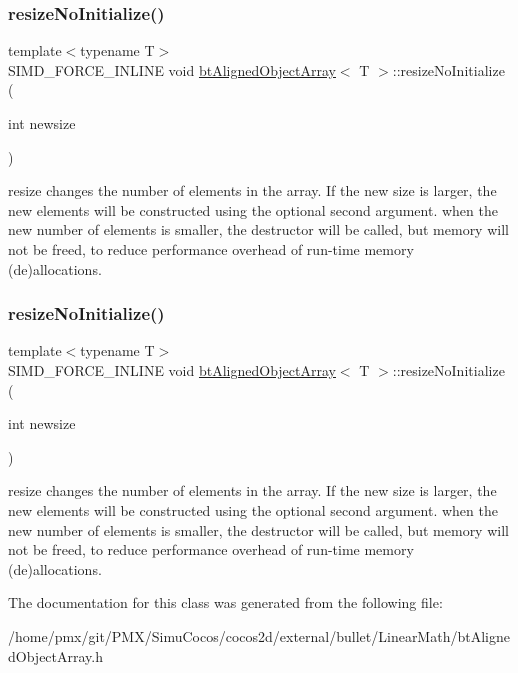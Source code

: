 \subsubsection{\texorpdfstring{resize\+No\+Initialize()}{resizeNoInitialize()}\hspace{0.1cm}{\footnotesize\ttfamily [1/2]}}
{\footnotesize\ttfamily template$<$typename T$>$ \\
S\+I\+M\+D\+\_\+\+F\+O\+R\+C\+E\+\_\+\+I\+N\+L\+I\+NE void \hyperlink{classbtAlignedObjectArray}{bt\+Aligned\+Object\+Array}$<$ T $>$\+::resize\+No\+Initialize (\begin{DoxyParamCaption}\item[{int}]{newsize }\end{DoxyParamCaption})\hspace{0.3cm}{\ttfamily [inline]}}

resize changes the number of elements in the array. If the new size is larger, the new elements will be constructed using the optional second argument. when the new number of elements is smaller, the destructor will be called, but memory will not be freed, to reduce performance overhead of run-\/time memory (de)allocations. \mbox{\label{classbtAlignedObjectArray_a2cc58c74534181a7a10e5c6ab8b21227}} 
\subsubsection{\texorpdfstring{resize\+No\+Initialize()}{resizeNoInitialize()}\hspace{0.1cm}{\footnotesize\ttfamily [2/2]}}
{\footnotesize\ttfamily template$<$typename T$>$ \\
S\+I\+M\+D\+\_\+\+F\+O\+R\+C\+E\+\_\+\+I\+N\+L\+I\+NE void \hyperlink{classbtAlignedObjectArray}{bt\+Aligned\+Object\+Array}$<$ T $>$\+::resize\+No\+Initialize (\begin{DoxyParamCaption}\item[{int}]{newsize }\end{DoxyParamCaption})\hspace{0.3cm}{\ttfamily [inline]}}

resize changes the number of elements in the array. If the new size is larger, the new elements will be constructed using the optional second argument. when the new number of elements is smaller, the destructor will be called, but memory will not be freed, to reduce performance overhead of run-\/time memory (de)allocations. 

The documentation for this class was generated from the following file\+:\begin{DoxyCompactItemize}
\item 
/home/pmx/git/\+P\+M\+X/\+Simu\+Cocos/cocos2d/external/bullet/\+Linear\+Math/bt\+Aligned\+Object\+Array.\+h\end{DoxyCompactItemize}
